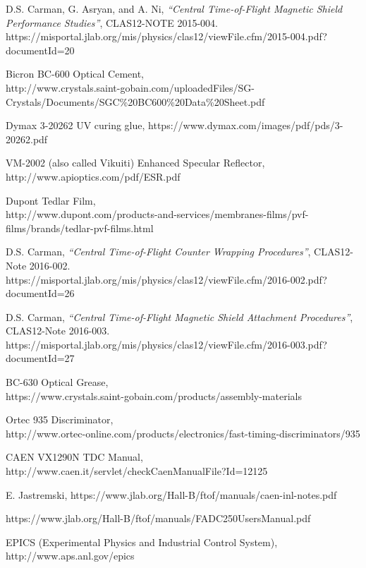 \documentclass{elsart}
\begin{document}
\begin{thebibliography}{99}
D.S. Carman, G. Asryan, and A. Ni, {\it ``Central Time-of-Flight Magnetic Shield Performance 
Studies''}, CLAS12-NOTE 2015-004.\\
https://misportal.jlab.org/mis/physics/clas12/viewFile.cfm/2015-004.pdf?documentId=20

Bicron BC-600 Optical Cement,\\
http://www.crystals.saint-gobain.com/uploadedFiles/SG-Crystals/Documents/SGC\%20BC600\%20Data\%20Sheet.pdf

Dymax 3-20262 UV curing glue, https://www.dymax.com/images/pdf/pds/3-20262.pdf
  
VM-2002 (also called Vikuiti) Enhanced Specular Reflector, \\
http://www.apioptics.com/pdf/ESR.pdf

Dupont Tedlar Film,\\
http://www.dupont.com/products-and-services/membranes-films/pvf-films/brands/tedlar-pvf-films.html

D.S. Carman, {\it ``Central Time-of-Flight Counter Wrapping Procedures''}, CLAS12-Note 2016-002.\\
https://misportal.jlab.org/mis/physics/clas12/viewFile.cfm/2016-002.pdf?documentId=26

D.S. Carman, {\it ``Central Time-of-Flight Magnetic Shield Attachment Procedures''}, CLAS12-Note 
2016-003.\\
https://misportal.jlab.org/mis/physics/clas12/viewFile.cfm/2016-003.pdf?documentId=27

BC-630 Optical Grease,\\
https://www.crystals.saint-gobain.com/products/assembly-materials
  
Ortec 935 Discriminator, \\
http://www.ortec-online.com/products/electronics/fast-timing-discriminators/935

CAEN VX1290N TDC Manual,\\
http://www.caen.it/servlet/checkCaenManualFile?Id=12125
  
E. Jastremski, https://www.jlab.org/Hall-B/ftof/manuals/caen-inl-notes.pdf

https://www.jlab.org/Hall-B/ftof/manuals/FADC250UsersManual.pdf
  
EPICS (Experimental Physics and Industrial Control System),\\ http://www.aps.anl.gov/epics


\end{thebibliography}
\end{document}

